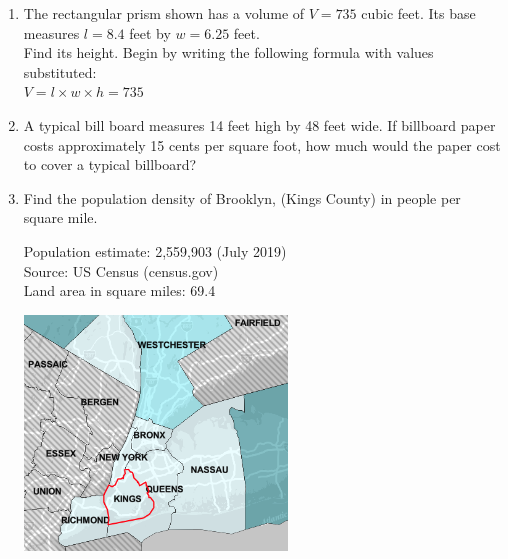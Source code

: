 \begin{enumerate}
\item The rectangular prism shown has a volume of $V=735$ cubic feet. Its base measures $l=8.4$ feet by $w=6.25$ feet. \\[0.25cm]
Find its height. Begin by writing the following formula with values substituted: \\[0.25cm]
$V = l \times w \times h = 735$
\begin{flushright}
\end{flushright}

\newpage
\item A typical bill board measures 14 feet high by 48 feet wide. If billboard paper costs approximately 15 cents per square foot, how much would the paper cost to cover a typical billboard? \vspace{3cm}

\item Find the population density of Brooklyn, (Kings County) in people per square mile.
\begin{multicols}{2}
  Population estimate: 2,559,903 (July 2019)\\
  Source: US Census (census.gov) \\
  Land area in square miles: 69.4 %
  \begin{flushright}
    \includegraphics[width=7cm]{../graphics/04Brooklyn.png}\\
  \end{flushright}
\end{multicols}


\end{enumerate}
